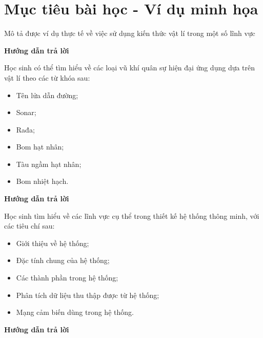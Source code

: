 \section{Mục tiêu bài học - Ví dụ minh họa}
\begin{dang}{Mô tả được ví dụ thực tế về việc sử dụng kiến thức vật lí trong một số lĩnh vực}
	{	\begin{center}
			\textbf{Hướng dẫn trả lời}
		\end{center}
		
		Học sinh có thể tìm hiểu về các loại vũ khí quân sự hiện đại ứng dụng dựa trên vật lí theo các từ khóa sau:
		\begin{itemize}
			\item Tên lửa dẫn đường;
			\item Sonar;
			\item Rađa;
			\item Bom hạt nhân;
			\item Tàu ngầm hạt nhân;
			\item Bom nhiệt hạch.
		\end{itemize}
	}
	{	\begin{center}
			\textbf{Hướng dẫn trả lời}
		\end{center}
		
		Học sinh tìm hiểu về các lĩnh vực cụ thể trong thiết kế hệ thống thông minh, với các tiêu chí sau:
		\begin{itemize}
			\item Giới thiệu về hệ thống;
			\item Đặc tính chung của hệ thống;
			\item Các thành phần trong hệ thống;
			\item Phân tích dữ liệu thu thập được từ hệ thống;
			\item Mạng cảm biến dùng trong hệ thống.
		\end{itemize}
		
	}

	{	\begin{center}
			\textbf{Hướng dẫn trả lời}
		\end{center}
		
}
\end{dang}
